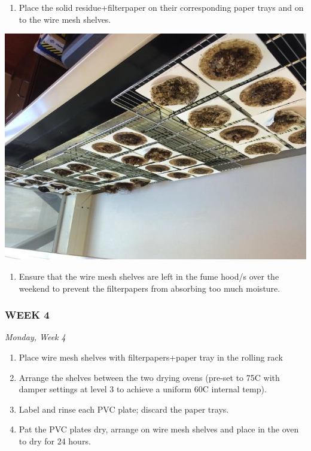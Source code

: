 \documentclass[]{book}
\providecommand{\tightlist}{%
  \setlength{\itemsep}{0pt}\setlength{\parskip}{0pt}}
\begin{document}
\begin{enumerate}
\def\labelenumi{\arabic{enumi}.}
\setcounter{enumi}{6}
\tightlist
\item
  Place the solid residue+filterpaper on their corresponding paper trays and on to the wire mesh shelves.
\end{enumerate}

\includegraphics{images/DailyTasks14.jpg}

\begin{enumerate}
\def\labelenumi{\arabic{enumi}.}
\setcounter{enumi}{7}
\tightlist
\item
  Ensure that the wire mesh shelves are left in the fume hood/s over the weekend to prevent the filterpapers from absorbing too much moisture.
\end{enumerate}

\hypertarget{week-4}{%
\subsubsection{WEEK 4}\label{week-4}}

\emph{Monday, Week 4}

\begin{enumerate}
\def\labelenumi{\arabic{enumi}.}
\tightlist
\item
  Place wire mesh shelves with filterpapers+paper tray in the rolling rack
\item
  Arrange the shelves between the two drying ovens (pre-set to 75C with damper settings at level 3 to achieve a uniform 60C internal temp).
\item
  Label and rinse each PVC plate; discard the paper trays.
\item
  Pat the PVC plates dry, arrange on wire mesh shelves and place in the oven to dry for 24 hours.
\end{enumerate}
\end{document}
